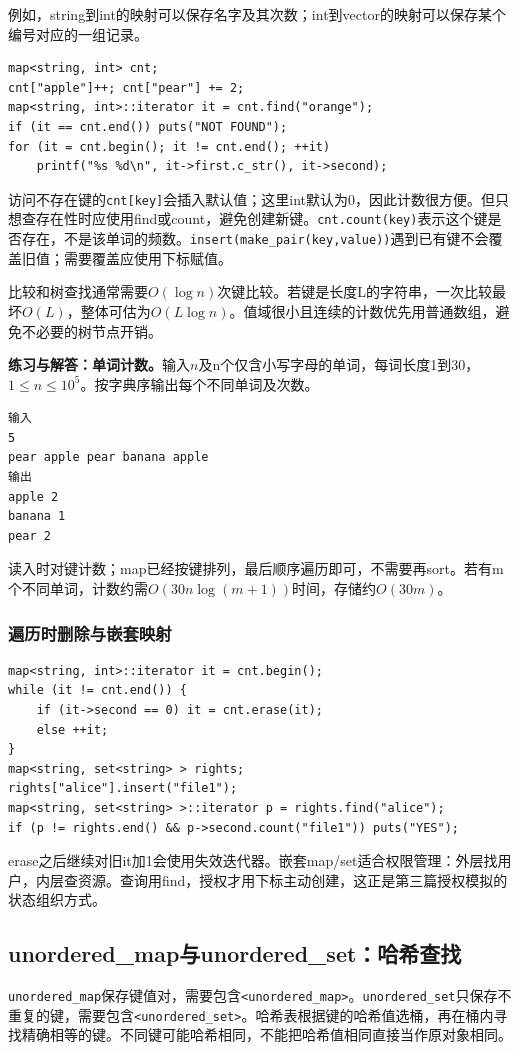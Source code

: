 例如，string到int的映射可以保存名字及其次数；int到vector的映射可以保存某个编号对应的一组记录。
\begin{lstlisting}
map<string, int> cnt;
cnt["apple"]++; cnt["pear"] += 2;
map<string, int>::iterator it = cnt.find("orange");
if (it == cnt.end()) puts("NOT FOUND");
for (it = cnt.begin(); it != cnt.end(); ++it)
    printf("%s %d\n", it->first.c_str(), it->second);
\end{lstlisting}
访问不存在键的\texttt{cnt[key]}会插入默认值；这里int默认为0，因此计数很方便。但只想查存在性时应使用find或count，避免创建新键。\texttt{cnt.count(key)}表示这个键是否存在，不是该单词的频数。\texttt{insert(make\_pair(key,value))}遇到已有键不会覆盖旧值；需要覆盖应使用下标赋值。

比较和树查找通常需要$O(\log n)$次键比较。若键是长度L的字符串，一次比较最坏$O(L)$，整体可估为$O(L\log n)$。值域很小且连续的计数优先用普通数组，避免不必要的树节点开销。

\textbf{练习与解答：单词计数。}输入$n$及n个仅含小写字母的单词，每词长度1到30，$1\le n\le10^5$。按字典序输出每个不同单词及次数。
\begin{verbatim}
输入
5
pear apple pear banana apple
输出
apple 2
banana 1
pear 2
\end{verbatim}
读入时对键计数；map已经按键排列，最后顺序遍历即可，不需要再sort。若有m个不同单词，计数约需$O(30n\log(m+1))$时间，存储约$O(30m)$。

\subsubsection{遍历时删除与嵌套映射}
\begin{lstlisting}
map<string, int>::iterator it = cnt.begin();
while (it != cnt.end()) {
    if (it->second == 0) it = cnt.erase(it);
    else ++it;
}
map<string, set<string> > rights;
rights["alice"].insert("file1");
map<string, set<string> >::iterator p = rights.find("alice");
if (p != rights.end() && p->second.count("file1")) puts("YES");
\end{lstlisting}
erase之后继续对旧it加1会使用失效迭代器。嵌套map/set适合权限管理：外层找用户，内层查资源。查询用find，授权才用下标主动创建，这正是第三篇授权模拟的状态组织方式。

\subsection{unordered\_map与unordered\_set：哈希查找}
\texttt{unordered\_map}保存键值对，需要包含\texttt{<unordered\_map>}。\texttt{unordered\_set}只保存不重复的键，需要包含\texttt{<unordered\_set>}。哈希表根据键的哈希值选桶，再在桶内寻找精确相等的键。不同键可能哈希相同，不能把哈希值相同直接当作原对象相同。

